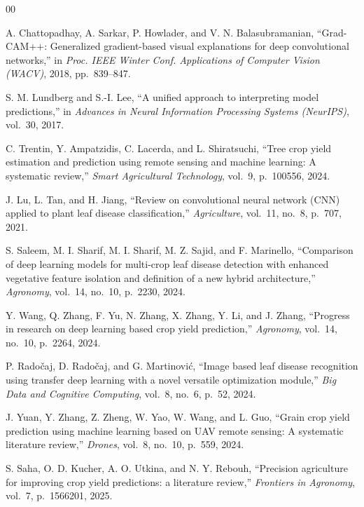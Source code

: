 \documentclass[conference]{IEEEtran}
\begin{document}
\begin{thebibliography}{00}

 A. Chattopadhay, A. Sarkar, P. Howlader, and V. N. Balasubramanian, ``Grad-CAM++: Generalized gradient-based visual explanations for deep convolutional networks,'' in \textit{Proc. IEEE Winter Conf. Applications of Computer Vision (WACV)}, 2018, pp.~839--847.

 S. M. Lundberg and S.-I. Lee, ``A unified approach to interpreting model predictions,'' in \textit{Advances in Neural Information Processing Systems (NeurIPS)}, vol.~30, 2017.

 C. Trentin, Y. Ampatzidis, C. Lacerda, and L. Shiratsuchi, ``Tree crop yield estimation and prediction using remote sensing and machine learning: A systematic review,'' \textit{Smart Agricultural Technology}, vol.~9, p.~100556, 2024.

 J. Lu, L. Tan, and H. Jiang, ``Review on convolutional neural network (CNN) applied to plant leaf disease classification,'' \textit{Agriculture}, vol.~11, no.~8, p.~707, 2021.

 S. Saleem, M. I. Sharif, M. I. Sharif, M. Z. Sajid, and F. Marinello, ``Comparison of deep learning models for multi-crop leaf disease detection with enhanced vegetative feature isolation and definition of a new hybrid architecture,'' \textit{Agronomy}, vol.~14, no.~10, p.~2230, 2024.

 Y. Wang, Q. Zhang, F. Yu, N. Zhang, X. Zhang, Y. Li, and J. Zhang, ``Progress in research on deep learning based crop yield prediction,'' \textit{Agronomy}, vol.~14, no.~10, p.~2264, 2024.

 P. Rado\v{c}aj, D. Rado\v{c}aj, and G. Martinovi\'{c}, ``Image based leaf disease recognition using transfer deep learning with a novel versatile optimization module,'' \textit{Big Data and Cognitive Computing}, vol.~8, no.~6, p.~52, 2024.

 J. Yuan, Y. Zhang, Z. Zheng, W. Yao, W. Wang, and L. Guo, ``Grain crop yield prediction using machine learning based on UAV remote sensing: A systematic literature review,'' \textit{Drones}, vol.~8, no.~10, p.~559, 2024.

 S. Saha, O. D. Kucher, A. O. Utkina, and N. Y. Rebouh, ``Precision agriculture for improving crop yield predictions: a literature review,'' \textit{Frontiers in Agronomy}, vol.~7, p.~1566201, 2025.


\end{thebibliography}
\end{document}
